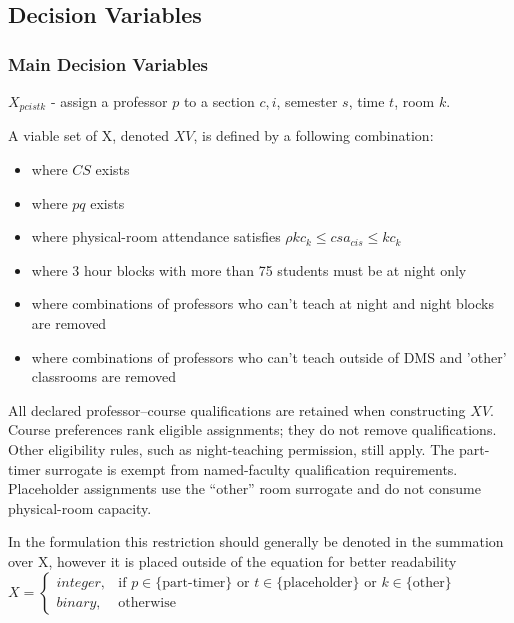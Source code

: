 \documentclass[11pt, oneside]{article}   	%
\begin{document}
\subsection{Decision Variables} 


\subsubsection{Main Decision Variables}
$X_{pcistk}$ -  assign a professor $p$ to a section $c,i$, semester $s$, time $t$, room $k$. 

A viable set of X, denoted $XV$, is defined by a following combination:
\begin{itemize}
	\item where $CS$ exists
	\item where $pq$ exists
	\item where physical-room attendance satisfies $\rho kc_k\le csa_{cis}\le kc_k$
	\item where 3 hour blocks with more than 75 students must be at night only
	\item where combinations of professors who can't teach at night and night blocks are removed
	\item where combinations of professors who can't teach outside of DMS and 'other' classrooms are removed
\end{itemize}

All declared professor--course qualifications are retained when constructing
$XV$. Course preferences rank eligible assignments; they do not remove
qualifications. Other eligibility rules, such as night-teaching permission,
still apply. The part-timer surrogate is exempt from named-faculty qualification
requirements. Placeholder assignments use the ``other'' room surrogate and do
not consume physical-room capacity.

In the formulation this restriction should generally be denoted in the summation over X, however it is placed outside of the equation for better readability\\ 

$X = \begin{cases}  integer, & \text{if } p \in \{\text{part-timer}\} \text{ or } t \in \{\text{placeholder} \} \text{ or } k \in \{\text{other}\}\\
binary, & \text{otherwise} \end{cases}$
\end{document}
